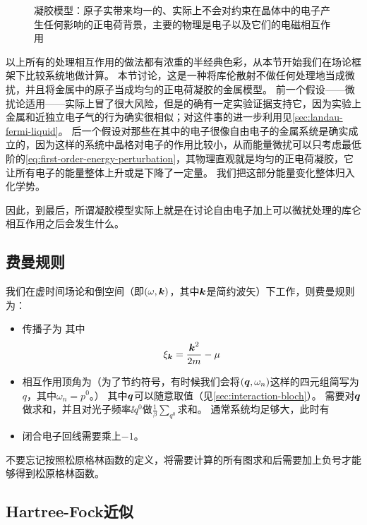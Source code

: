 \begin{figure}
    \centering
    
    \caption{凝胶模型：原子实带来均一的、实际上不会对约束在晶体中的电子产生任何影响的正电荷背景，主要的物理是电子以及它们的电磁相互作用}
\end{figure}

以上所有的处理相互作用的做法都有浓重的半经典色彩，从本节开始我们在场论框架下比较系统地做计算。
本节讨论，这是一种将库伦散射不做任何处理地当成微扰，并且将金属中的原子当成均匀的正电荷凝胶的金属模型。
前一个假设——微扰论适用——实际上冒了很大风险，但是的确有一定实验证据支持它，因为实验上金属和近独立电子气的行为确实很相似；对这件事的进一步利用见\autoref{sec:landau-fermi-liquid}。
后一个假设对那些在其中的电子很像自由电子的金属系统是确实成立的，因为这样的系统中晶格对电子的作用比较小，从而能量微扰可以只考虑最低阶的\eqref{eq:first-order-energy-perturbation}，其物理直观就是均匀的正电荷凝胶，它让所有电子的能量整体上升或是下降了一定量。
我们把这部分能量变化整体归入化学势。

因此，到最后，所谓凝胶模型实际上就是在讨论自由电子加上可以微扰处理的库仑相互作用之后会发生什么。

\subsection{费曼规则}

我们在虚时间场论和倒空间（即$(\omega, \vb*{k})$，其中$\vb*{k}$是简约波矢）下工作，则费曼规则为：
\begin{itemize}
    \item 传播子为
    其中
    \begin{equation}
        \xi_{\vb*{k}} = \frac{\vb*{k}^2}{2m} - \mu
    \end{equation}
    \item 相互作用顶角为（为了节约符号，有时候我们会将$(\vb*{q}, \omega_n)$这样的四元组简写为$q$，其中$\omega_n = p^0$。）
    其中$\vb*{q}$可以随意取值（见\autoref{sec:interaction-bloch}）。
    需要对$\vb*{q}$做求和，并且对光子频率$\ii q^0$做$\frac{1}{\beta} \sum_{q^0}$求和。
    通常系统均足够大，此时有
    \item 闭合电子回线需要乘上$-1$。
\end{itemize}
不要忘记按照松原格林函数的定义，将需要计算的所有图求和后需要加上负号才能够得到松原格林函数。

\subsection{Hartree-Fock近似}



